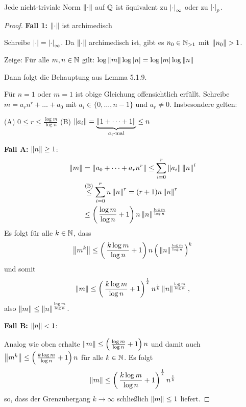 \setcounter{Satz}{0}
\begin{Satz}
Jede nicht-triviale Norm $\left\|{\cdot}\right\|$ auf $\mathbb{Q}$ ist äquivalent zu $\left|{\cdot}\right|_\infty$ oder zu $\left|{\cdot}\right|_p$.
\end{Satz}

\begin{proof}
\textbf{Fall 1:} $\left\|{\cdot}\right\|$ ist archimedisch

Schreibe $\left|{\cdot}\right| = \left|{\cdot}\right|_\infty$. Da $\left\|{\cdot}\right\|$ archimedisch ist, gibt es $n_0 \in \mathbb{N}_{>1}$ mit $\norm{n_0}>1$.

\bigskip Zeige: Für alle $m,n\in \mathbb{N}$ gilt:
$\log \left\|{m}\right\| \log \left|{n}\right| = \log \left|{m}\right| \log \left\|{n}\right\|$

Dann folgt die Behauptung aus Lemma 5.1.9.

\bigskip Für $n=1$ oder $m=1$ ist obige Gleichung offensichtlich erfüllt.
Schreibe $m=a_rn^r + \dots + a_0$ mit $a_i \in \{ 0, \dots, n-1 \}$ und $a_r \neq 0$.
Insbesondere gelten: 

(A) $0 \leq r \leq \frac{\log m}{\log n}$ 
\qquad 
(B) $\left\|{a_i}\right\| = \underbrace{\left\|{1+ \dots + 1}\right\|}_{\text{$a_i$-mal}} \leq n$

\bigskip \textbf{Fall A:} $\left\|{n}\right\| \geq 1$:
\begin{align*}
\left\|{m}\right\|
&= \left\|{a_0 + \dots + a_rn^r}\right\|
\leq \sum_{i=0}^{r} \left\|{a_i}\right\| \left\|{n}\right\|^i\\
&\overset{\text{(B)}}{ \leq} \sum_{i=0}^{r}  n \left\|{n}\right\|^r
=(r+1)n\left\|{n}\right\|^r \\
&\leq \left(\, \frac{\log m}{\log n} +1  \right)n \left\|{n}\right\|^{ \frac{\log m}{\log n} }
\end{align*}
Es folgt für alle $k \in \mathbb{N}$, dass
\[ \left\|{m^k}\right\| \leq \left(\, \frac{k\log m}{\log n} +1  \right) n \left(\, \left\|{n}\right\|^{ \frac{\log m}{\log n} } \right)^k
\]
und somit
\[ \left\|{m}\right\| \leq \left(\, \frac{k\log m}{\log n} +1  \right)^{\frac{1}{k}} n^{\frac{1}{k}}  \left\|{n}\right\|^{ \frac{\log m}{\log n} } ,
\]
also $\left\|{m}\right\| \leq \left\|{n}\right\|^{ \frac{\log m}{\log n} }$.

\bigskip \textbf{Fall B:} $\left\|{n}\right\| < 1$:

Analog wie oben erhalte $\left\|{m}\right\| \leq \left(\, \frac{\log m}{\log n} +1  \right) n$
und damit auch $\left\|{m^k}\right\| \leq \left(\, \frac{k\log m}{\log n} +1  \right) n$ für alle $k \in \mathbb{N}$.
Es folgt
\[ \left\|{m}\right\| \leq \left(\, \frac{k\log m}{\log n} +1  \right)^{\frac{1}{k}} n^{\frac{1}{k}}
\]
so, dass der Grenzübergang $k \to \infty$ schließlich $\left\|{m}\right\| \leq 1$ liefert.


\end{proof}
